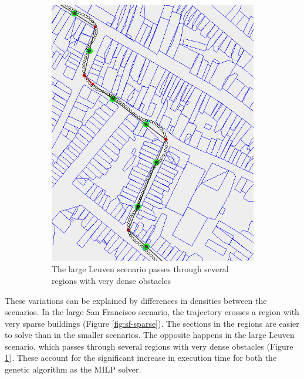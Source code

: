 \begin{figure}[h]
\begin{subfigure}[t]{.45\textwidth}
        		\includegraphics[width=\textwidth]{img/leuven-dense-2}
        		\caption{The large Leuven scenario passes through several regions with very dense obstacles}
        		\label{fig:leuven-dense}
	\end{subfigure}	
	
        
    \caption[The variations in density in different scenarios in the same world]{}\label{fig:perf-density}
\end{figure}

These variations can be explained by differences in densities between the scenarios. In the large San Francisco scenario, the trajectory crosses a region with very sparse buildings (Figure \ref{fig:sf-sparse}). The sections in the regions are easier to solve than in the smaller scenarios. The opposite happens in the large Leuven scenario, which passes through several regions with very dense obstacles (Figure \ref{fig:leuven-dense}). These account for the significant increase in execution time for both the genetic algorithm as the MILP solver.


